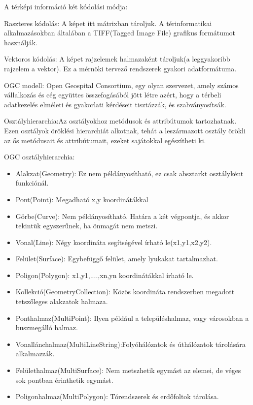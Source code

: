 A térképi információ két kódolási módja:

Raszteres kódolás: A képet itt mátrixban tároljuk. A térinformatikai alkalmazásokban általában a TIFF(Tagged Image File) grafikus formátumot használják.


Vektoros kódolás: A képet rajzelemek halmazaként tároljuk(a leggyakoribb rajzelem a vektor). Ez a mérnöki tervező rendszerek gyakori adatformátuma.

OGC modell: Open Geospital Consortium, egy olyan szervezet, amely számos vállalkozás és cég együttes összefogásából jött létre azért, hogy a térbeli adatkezelés elméleti és gyakorlati kérdéseit tisztázzák, és szabványosítsák. 

Osztályhierarchia:Az osztályokhoz metódusok és attribútumok tartozhatnak. Ezen osztályok öröklési hierarchiát alkotnak, tehát a leszármazott osztály örökli az ős metódusait és attribútumait, ezeket sajátokkal egészítheti ki. 

OGC osztályhierarchia:
\begin{itemize}  
\item Alakzat(Geometry): Ez nem példányosítható, ez csak absztarkt osztályként funkciónál.
\item Pont(Point): Megadható x,y koordinátákkal
\item Görbe(Curve): Nem példányosítható. Határa a két végpontja, és akkor tekintük egyszerűnek, ha önmagát nem metszi.
\item Vonal(Line): Négy koordináta segítségével írható le(x1,y1,x2,y2).
\item Felület(Surface): Egybefüggő felület, amely lyukakat tartalmazhat.
\item Poligon(Polygon): x1,y1,....,xn,yn koordinátákkal írható le.
\item Kollekció(GeometryCollection): Közös koordináta rendszerben megadott tetszőleges alakzatok halmaza.
\item Ponthalmaz(MultiPoint): Ilyen például a településhalmaz, vagy városokban a \\ buszmegálló halmaz. 
\item Vonallánchalmaz(MultiLineString):Folyóhálózatok és úthálózatok tárolására alkalmazzák.
\item Felülethalmaz(MultiSurface): Nem metszhetik egymást az elemei, de véges sok pontban érinthetik egymást.
\item Poligonhalmaz(MultiPolygon): Tórendszerek és erdőfoltok tárolása.
\end{itemize}



